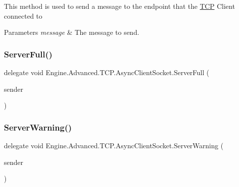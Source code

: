 This method is used to send a message to the endpoint that the \mbox{\hyperlink{namespace_engine_1_1_advanced_1_1_t_c_p}{T\+CP}} Client connected to 


\begin{DoxyParams}{Parameters}
{\em message} & The message to send.\\
\hline
\end{DoxyParams}
\mbox{\label{class_engine_1_1_advanced_1_1_t_c_p_1_1_async_client_socket_a992805398f43802c511b8f40a9344254}} 
\subsubsection{\texorpdfstring{ServerFull()}{ServerFull()}}
{\footnotesize\ttfamily delegate void Engine.\+Advanced.\+T\+C\+P.\+Async\+Client\+Socket.\+Server\+Full (\begin{DoxyParamCaption}\item[{\mbox{\hyperlink{class_engine_1_1_advanced_1_1_t_c_p_1_1_async_client_socket}{Async\+Client\+Socket}}}]{sender }\end{DoxyParamCaption})}

\mbox{\label{class_engine_1_1_advanced_1_1_t_c_p_1_1_async_client_socket_a519c68733927ee8465d4d38726c137f8}} 
\subsubsection{\texorpdfstring{ServerWarning()}{ServerWarning()}}
{\footnotesize\ttfamily delegate void Engine.\+Advanced.\+T\+C\+P.\+Async\+Client\+Socket.\+Server\+Warning (\begin{DoxyParamCaption}\item[{\mbox{\hyperlink{class_engine_1_1_advanced_1_1_t_c_p_1_1_async_client_socket}{Async\+Client\+Socket}}}]{sender }\end{DoxyParamCaption})}

